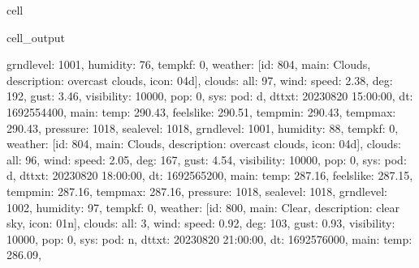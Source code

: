 \documentclass[letterpaper,10pt,english]{jupyterBook}
\begin{document}
\begin{sphinxuseclass}{cell}
\begin{sphinxVerbatimOutput}
\begin{sphinxuseclass}{cell_output}
\begin{sphinxVerbatim}[commandchars=\\\{\}]
\PYGZsq{}grnd\PYGZus{}level\PYGZsq{}: 1001, \PYGZsq{}humidity\PYGZsq{}: 76, \PYGZsq{}temp\PYGZus{}kf\PYGZsq{}: 0\PYGZcb{}, \PYGZsq{}weather\PYGZsq{}: [\PYGZob{}\PYGZsq{}id\PYGZsq{}: 804, \PYGZsq{}main\PYGZsq{}: \PYGZsq{}Clouds\PYGZsq{}, \PYGZsq{}description\PYGZsq{}: \PYGZsq{}overcast clouds\PYGZsq{}, \PYGZsq{}icon\PYGZsq{}: \PYGZsq{}04d\PYGZsq{}\PYGZcb{}], \PYGZsq{}clouds\PYGZsq{}: \PYGZob{}\PYGZsq{}all\PYGZsq{}: 97\PYGZcb{}, \PYGZsq{}wind\PYGZsq{}: \PYGZob{}\PYGZsq{}speed\PYGZsq{}: 2.38, \PYGZsq{}deg\PYGZsq{}: 192, \PYGZsq{}gust\PYGZsq{}: 3.46\PYGZcb{}, \PYGZsq{}visibility\PYGZsq{}: 10000, \PYGZsq{}pop\PYGZsq{}: 0, \PYGZsq{}sys\PYGZsq{}: \PYGZob{}\PYGZsq{}pod\PYGZsq{}: \PYGZsq{}d\PYGZsq{}\PYGZcb{}, \PYGZsq{}dt\PYGZus{}txt\PYGZsq{}: \PYGZsq{}2023\PYGZhy{}08\PYGZhy{}20 15:00:00\PYGZsq{}\PYGZcb{}, \PYGZob{}\PYGZsq{}dt\PYGZsq{}: 1692554400, \PYGZsq{}main\PYGZsq{}: \PYGZob{}\PYGZsq{}temp\PYGZsq{}: 290.43, \PYGZsq{}feels\PYGZus{}like\PYGZsq{}: 290.51, \PYGZsq{}temp\PYGZus{}min\PYGZsq{}: 290.43, \PYGZsq{}temp\PYGZus{}max\PYGZsq{}: 290.43, \PYGZsq{}pressure\PYGZsq{}: 1018, \PYGZsq{}sea\PYGZus{}level\PYGZsq{}: 1018, \PYGZsq{}grnd\PYGZus{}level\PYGZsq{}: 1001, \PYGZsq{}humidity\PYGZsq{}: 88, \PYGZsq{}temp\PYGZus{}kf\PYGZsq{}: 0\PYGZcb{}, \PYGZsq{}weather\PYGZsq{}: [\PYGZob{}\PYGZsq{}id\PYGZsq{}: 804, \PYGZsq{}main\PYGZsq{}: \PYGZsq{}Clouds\PYGZsq{}, \PYGZsq{}description\PYGZsq{}: \PYGZsq{}overcast clouds\PYGZsq{}, \PYGZsq{}icon\PYGZsq{}: \PYGZsq{}04d\PYGZsq{}\PYGZcb{}], \PYGZsq{}clouds\PYGZsq{}: \PYGZob{}\PYGZsq{}all\PYGZsq{}: 96\PYGZcb{}, \PYGZsq{}wind\PYGZsq{}: \PYGZob{}\PYGZsq{}speed\PYGZsq{}: 2.05, \PYGZsq{}deg\PYGZsq{}: 167, \PYGZsq{}gust\PYGZsq{}: 4.54\PYGZcb{}, \PYGZsq{}visibility\PYGZsq{}: 10000, \PYGZsq{}pop\PYGZsq{}: 0, \PYGZsq{}sys\PYGZsq{}: \PYGZob{}\PYGZsq{}pod\PYGZsq{}: \PYGZsq{}d\PYGZsq{}\PYGZcb{}, \PYGZsq{}dt\PYGZus{}txt\PYGZsq{}: \PYGZsq{}2023\PYGZhy{}08\PYGZhy{}20 18:00:00\PYGZsq{}\PYGZcb{}, \PYGZob{}\PYGZsq{}dt\PYGZsq{}: 1692565200, \PYGZsq{}main\PYGZsq{}: \PYGZob{}\PYGZsq{}temp\PYGZsq{}: 287.16, \PYGZsq{}feels\PYGZus{}like\PYGZsq{}: 287.15, \PYGZsq{}temp\PYGZus{}min\PYGZsq{}: 287.16, \PYGZsq{}temp\PYGZus{}max\PYGZsq{}: 287.16, \PYGZsq{}pressure\PYGZsq{}: 1018, \PYGZsq{}sea\PYGZus{}level\PYGZsq{}: 1018, \PYGZsq{}grnd\PYGZus{}level\PYGZsq{}: 1002, \PYGZsq{}humidity\PYGZsq{}: 97, \PYGZsq{}temp\PYGZus{}kf\PYGZsq{}: 0\PYGZcb{}, \PYGZsq{}weather\PYGZsq{}: [\PYGZob{}\PYGZsq{}id\PYGZsq{}: 800, \PYGZsq{}main\PYGZsq{}: \PYGZsq{}Clear\PYGZsq{}, \PYGZsq{}description\PYGZsq{}: \PYGZsq{}clear sky\PYGZsq{}, \PYGZsq{}icon\PYGZsq{}: \PYGZsq{}01n\PYGZsq{}\PYGZcb{}], \PYGZsq{}clouds\PYGZsq{}: \PYGZob{}\PYGZsq{}all\PYGZsq{}: 3\PYGZcb{}, \PYGZsq{}wind\PYGZsq{}: \PYGZob{}\PYGZsq{}speed\PYGZsq{}: 0.92, \PYGZsq{}deg\PYGZsq{}: 103, \PYGZsq{}gust\PYGZsq{}: 0.93\PYGZcb{}, \PYGZsq{}visibility\PYGZsq{}: 10000, \PYGZsq{}pop\PYGZsq{}: 0, \PYGZsq{}sys\PYGZsq{}: \PYGZob{}\PYGZsq{}pod\PYGZsq{}: \PYGZsq{}n\PYGZsq{}\PYGZcb{}, \PYGZsq{}dt\PYGZus{}txt\PYGZsq{}: \PYGZsq{}2023\PYGZhy{}08\PYGZhy{}20 21:00:00\PYGZsq{}\PYGZcb{}, \PYGZob{}\PYGZsq{}dt\PYGZsq{}: 1692576000, \PYGZsq{}main\PYGZsq{}: \PYGZob{}\PYGZsq{}temp\PYGZsq{}: 286.09, 
\end{sphinxVerbatim}
\end{sphinxuseclass}
\end{sphinxVerbatimOutput}
\end{sphinxuseclass}
\end{document}
